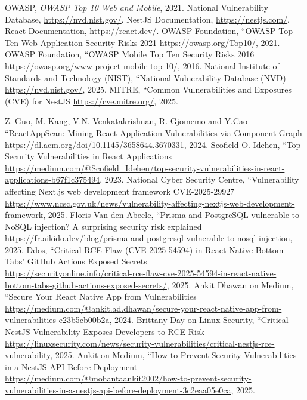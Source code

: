 \documentclass[conference]{IEEEtran}
\begin{document}
\begin{thebibliography}{00}
 OWASP, \emph{OWASP Top 10 Web and Mobile}, 2021.
 National Vulnerability Database, \url{https://nvd.nist.gov/}.
 NestJS Documentation, \url{https://nestjs.com/}.
 React Documentation, \url{https://react.dev/}.
 OWASP Foundation, ``OWASP Top Ten Web Application Security Risks 2021 \url{https://owasp.org/Top10/}, 2021.
 OWASP Foundation, ``OWASP Mobile Top Ten Security Risks 2016 \url{https://owasp.org/www-project-mobile-top-10/}, 2016.
 National Institute of Standards and Technology (NIST), ``National Vulnerability Database (NVD) \url{https://nvd.nist.gov/}, 2025.
 MITRE, ``Common Vulnerabilities and Exposures (CVE) for NestJS \url{https://cve.mitre.org/}, 2025.

 Z. Guo, M. Kang, V.N. Venkatakrishnan, R. Gjomemo and Y.Cao ``ReactAppScan: Mining React Application Vulnerabilities via Component Graph \url{https://dl.acm.org/doi/10.1145/3658644.3670331}, 2024.
 Scofield O. Idehen, ``Top Security Vulnerabilities in React Applications \url{https://medium.com/@Scofield_Idehen/top-security-vulnerabilities-in-react-applications-b67f1c375494}, 2023.
 National Cyber Security Centre, ``Vulnerability affecting Next.js web development framework CVE-2025-29927 \\ \url{https://www.ncsc.gov.uk/news/vulnerability-affecting-nextjs-web-development-framework}, 2025.
 Floris Van den Abeele, ``Prisma and PostgreSQL vulnerable to NoSQL injection? A surprising security risk explained \url{https://fr.aikido.dev/blog/prisma-and-postgresql-vulnerable-to-nosql-injection}, 2025.
 Ddos, ``Critical RCE Flaw (CVE-2025-54594) in React Native Bottom Tabs’ GitHub Actions Exposed Secrets \\ \url{https://securityonline.info/critical-rce-flaw-cve-2025-54594-in-react-native-bottom-tabs-github-actions-exposed-secrets/}, 2025.
 Ankit Dhawan on Medium, ``Secure Your React Native App from Vulnerabilities \url{https://medium.com/@ankit.ad.dhawan/secure-your-react-native-app-from-vulnerabilities-e23b5cb00b2a}, 2024.
 Brittany Day on Linux Security,  ``Critical NestJS Vulnerability Exposes Developers to RCE Risk \url{https://linuxsecurity.com/news/security-vulnerabilities/critical-nestjs-rce-vulnerability}, 2025.
 Ankit on Medium, ``How to Prevent Security Vulnerabilities in a NestJS API Before Deployment \\ \url{https://medium.com/@mohantaankit2002/how-to-prevent-security-vulnerabilities-in-a-nestjs-api-before-deployment-3c2eaa05e0ca}, 2025.

\end{thebibliography}
\end{document}
